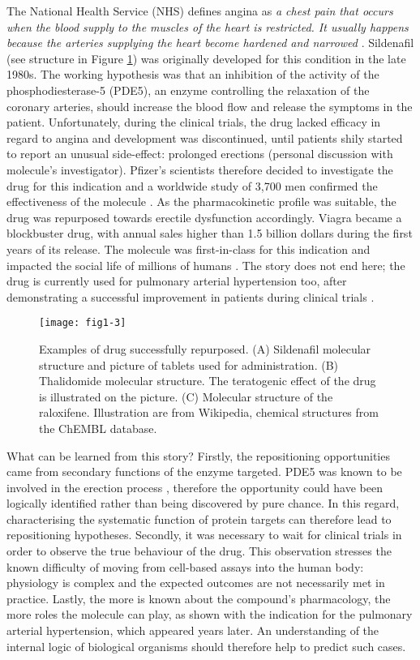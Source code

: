 The National Health Service (NHS) defines angina as \emph{a chest pain that occurs when the blood supply to the muscles of the heart is restricted. It usually happens because the arteries supplying the heart become hardened and narrowed} \citep{anginanhs}. Sildenafil (see structure in Figure \ref{fig1-3}) was originally developed for this condition in the late 1980s. The working hypothesis was that an inhibition of the activity of the phosphodiesterase-5 (PDE5), an enzyme controlling the relaxation of the coronary arteries, should increase the blood flow and release the symptoms in the patient. Unfortunately, during the clinical trials, the drug lacked efficacy in regard to angina and development was discontinued, until patients shily started to report an unusual side-effect: prolonged erections (personal discussion with molecule's investigator). Pfizer's scientists therefore decided to investigate the drug for this indication and a worldwide study of 3,700 men confirmed the effectiveness of the molecule \citep{nytimes}. As the pharmacokinetic profile was suitable, the drug was repurposed towards erectile dysfunction accordingly. Viagra became a blockbuster drug, with annual sales higher than 1.5 billion dollars \citep{renaud2002erectile} during the first years of its release. The molecule was first-in-class for this indication and impacted the social life of millions of humans \citep{renaud2002erectile}. The story does not end here; the drug is currently used for pulmonary arterial hypertension too, after demonstrating a successful improvement in patients during clinical trials \citep{ghofrani2006sildenafil}.

\begin{figure}[ht]
    \centering
    \texttt{[image: fig1-3]}
    \caption{Examples of drug successfully repurposed. (A) Sildenafil molecular structure and picture of tablets used for administration. (B) Thalidomide molecular structure. The teratogenic effect of the drug is illustrated on the picture. (C) Molecular structure of the raloxifene. Illustration are from Wikipedia, chemical structures from the ChEMBL database.}
    \label{fig1-3}
\end{figure}

What can be learned from this story? Firstly, the repositioning opportunities came from secondary functions of the enzyme targeted. PDE5 was known to be involved in the erection process \citep{krall1988characterization}, therefore the opportunity could have been logically identified rather than being discovered by pure chance. In this regard, characterising the systematic function of protein targets can therefore lead to repositioning hypotheses. Secondly, it was necessary to wait for clinical trials in order to observe the true behaviour of the drug. This observation stresses the known difficulty of moving from cell-based assays into the human body: physiology is complex and the expected outcomes are not necessarily met in practice. Lastly, the more is known about the compound's pharmacology, the more roles the molecule can play, as shown with the indication for the pulmonary arterial hypertension, which appeared years later. An understanding of the internal logic of biological organisms should therefore help to predict such cases.

